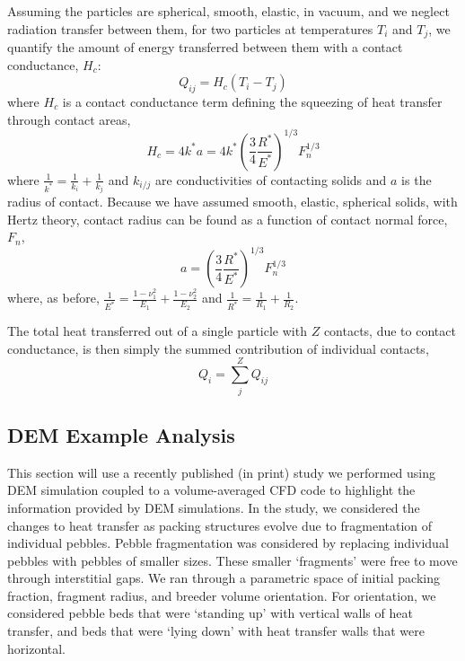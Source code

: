 \documentclass[11pt]{report} %
\begin{document}
Assuming the particles are spherical, smooth, elastic, in vacuum, and we neglect radiation transfer between them, for two particles at temperatures $T_i$ and $T_j$, we quantify the amount of energy transferred between them with a contact conductance, $H_c$:
\begin{equation}\label{eq:pebble-conduction-heat-transfer}
    Q_{ij} = H_{c}(T_i - T_j)
\end{equation}
where $H_c$ is a contact conductance term defining the squeezing of heat transfer through contact areas,\cite{Batchelor1977,Cheng19994199}
\begin{equation}\label{eq:cheng-modification-batchelor}
    H_c = 4k^*a = 4k^* \left(\frac{3}{4}\frac{R^*}{E^*}\right)^{1/3}F_n^{1/3}
\end{equation}
where $\frac{1}{k^*} = \frac{1}{k_i} + \frac{1}{k_j}$ and $k_{i/j}$ are conductivities of contacting solids and $a$ is the radius of contact. Because we have assumed smooth, elastic, spherical solids, with Hertz theory, contact radius can be found as a function of contact normal force, $F_n$,
\begin{equation}
    a =  \left(\frac{3}{4}\frac{R^*}{E^*}\right)^{1/3}F_n^{1/3} 
\end{equation}
where, as before, $\frac{1}{E^*} = \frac{1-\nu_1^2}{E_1} + \frac{1-\nu_2^2}{E_2}$ and $\frac{1}{R^*} = \frac{1}{R_1} + \frac{1}{R_2}$. 

The total heat transferred out of a single particle with $Z$ contacts, due to contact conductance, is then simply the summed contribution of individual contacts, 
\begin{equation}
    Q_i = \sum_j^Z Q_{ij}
\end{equation}

\subsection{DEM Example Analysis}
This section will use a recently published (in print) study we performed using DEM simulation coupled to a volume-averaged CFD code to highlight the information provided by DEM simulations. In the study, we considered the changes to heat transfer as packing structures evolve due to fragmentation of individual pebbles. Pebble fragmentation was considered by replacing individual pebbles with pebbles of smaller sizes. These smaller `fragments' were free to move through interstitial gaps. We ran through a parametric space of initial packing fraction, fragment radius, and breeder volume orientation. For orientation, we considered pebble beds that were `standing up' with vertical walls of heat transfer, and beds that were `lying down' with heat transfer walls that were horizontal.
\end{document}

